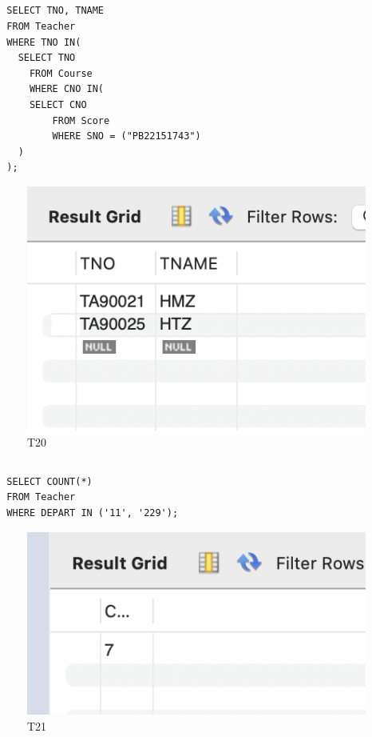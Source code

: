 \documentclass[UTF8]{ctexart}
\begin{document}
\subsection{}
\begin{lstlisting}
  SELECT TNO, TNAME
  FROM Teacher
  WHERE TNO IN(
    SELECT TNO
      FROM Course
      WHERE CNO IN(
      SELECT CNO
          FROM Score
          WHERE SNO = ("PB22151743")
    )
  );
\end{lstlisting}
\begin{figure}[H]
  \centering
  \includegraphics[scale=0.7]{pics/20.png}
  \caption*{T20}
\end{figure}

\subsection{}
\begin{lstlisting}
  SELECT COUNT(*)
  FROM Teacher
  WHERE DEPART IN ('11', '229');
\end{lstlisting}
\begin{figure}[H]
  \centering
  \includegraphics[scale=0.7]{pics/21.png}
  \caption*{T21}
\end{figure}
\end{document}

